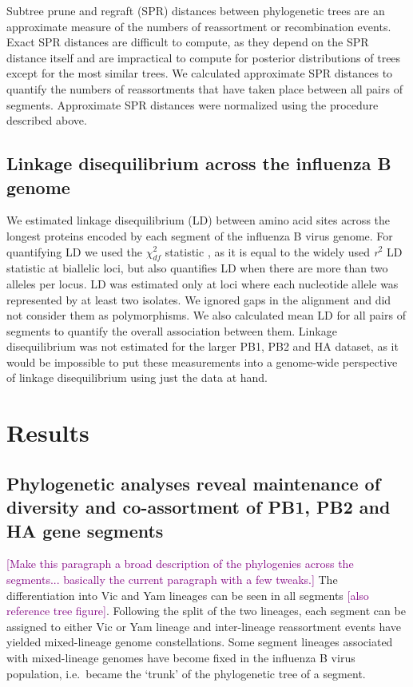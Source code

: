 \documentclass[11pt,oneside,letterpaper]{article}
\def\tbc#1{\textcolor{purple}{[#1]}}
\begin{document}
Subtree prune and regraft (SPR) distances between phylogenetic trees are an approximate measure of the numbers of reassortment or recombination events.
Exact SPR distances are difficult to compute, as they depend on the SPR distance itself and are impractical to compute for posterior distributions of trees except for the most similar trees.
We calculated approximate SPR distances \cite{whidden2009,whidden2010,whidden2013} to quantify the numbers of reassortments that have taken place between all pairs of segments.
Approximate SPR distances were normalized using the procedure described above.

\subsection*{Linkage disequilibrium across the influenza B genome}
We estimated linkage disequilibrium (LD) between amino acid sites across the longest proteins encoded by each segment of the influenza B virus genome.
For quantifying LD we used the $\chi^{2}_{df}$ statistic \cite{zhao2005}, as it is equal to the widely used \textit{r$^{2}$} LD statistic at biallelic loci, but also quantifies LD when there are more than two alleles per locus.
LD was estimated only at loci where each nucleotide allele was represented by at least two isolates.
We ignored gaps in the alignment and did not consider them as polymorphisms.
We also calculated mean LD for all pairs of segments to quantify the overall association between them.
Linkage disequilibrium was not estimated for the larger PB1, PB2 and HA dataset, as it would be impossible to put these measurements into a genome-wide perspective of linkage disequilibrium using just the data at hand.

\section*{Results}

\subsection*{Phylogenetic analyses reveal maintenance of diversity and co-assortment of PB1, PB2 and HA gene segments}

\tbc{Make this paragraph a broad description of the phylogenies across the segments... basically the current paragraph with a few tweaks.} The differentiation into Vic and Yam lineages can be seen in all segments \cite{chen2008} \tbc{also reference tree figure}.
Following the split of the two lineages, each segment can be assigned to either Vic or Yam lineage and inter-lineage reassortment events have yielded mixed-lineage genome constellations.
Some segment lineages associated with mixed-lineage genomes have become fixed in the influenza B virus population, i.e.\ became the `trunk' of the phylogenetic tree of a segment.
\end{document}
